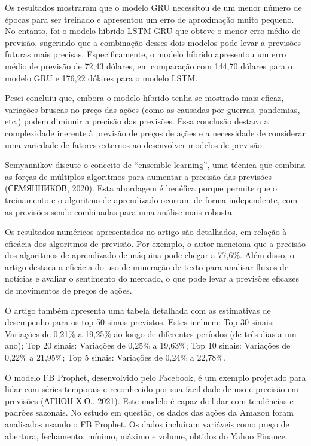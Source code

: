 \documentclass[
]{article}
\begin{document}
Os resultados mostraram que o modelo GRU necessitou de um menor número
de épocas para ser treinado e apresentou um erro de aproximação muito
pequeno. No entanto, foi o modelo híbrido LSTM-GRU que obteve o menor
erro médio de previsão, sugerindo que a combinação desses dois modelos
pode levar a previsões futuras mais precisas. Especificamente, o modelo
híbrido apresentou um erro médio de previsão de 72,43 dólares, em
comparação com 144,70 dólares para o modelo GRU e 176,22 dólares para o
modelo LSTM.

Pesci concluiu que, embora o modelo híbrido tenha se mostrado mais
eficaz, variações bruscas no preço das ações (como as causadas por
guerras, pandemias, etc.) podem diminuir a precisão das previsões. Essa
conclusão destaca a complexidade inerente à previsão de preços de ações
e a necessidade de considerar uma variedade de fatores externos ao
desenvolver modelos de previsão.

Semyannikov discute o conceito de ``ensemble learning'', uma técnica que
combina as forças de múltiplos algoritmos para aumentar a precisão das
previsões (СЕМЯННИКОВ, 2020). Esta abordagem é benéfica porque permite
que o treinamento e o algoritmo de aprendizado ocorram de forma
independente, com as previsões sendo combinadas para uma análise mais
robusta.

Os resultados numéricos apresentados no artigo são detalhados, em
relação à eficácia dos algoritmos de previsão. Por exemplo, o autor
menciona que a precisão dos algoritmos de aprendizado de máquina pode
chegar a 77,6\%. Além disso, o artigo destaca a eficácia do uso de
mineração de texto para analisar fluxos de notícias e avaliar o
sentimento do mercado, o que pode levar a previsões eficazes de
movimentos de preços de ações.

O artigo também apresenta uma tabela detalhada com as estimativas de
desempenho para os top 50 sinais previstos. Estes incluem: Top 30
sinais: Variações de 0,21\% a 19,25\% ao longo de diferentes períodos
(de três dias a um ano); Top 20 sinais: Variações de 0,25\% a 19,63\%;
Top 10 sinais: Variações de 0,22\% a 21,95\%; Top 5 sinais: Variações de
0,24\% a 22,78\%.

O modelo FB Prophet, desenvolvido pelo Facebook, é um exemplo projetado
para lidar com séries temporais e reconhecido por sua facilidade de uso
e precisão em previsões (АГНОН Х.О.. 2021). Este modelo é capaz de lidar
com tendências e padrões sazonais. No estudo em questão, os dados das
ações da Amazon foram analisados usando o FB Prophet. Os dados incluíram
variáveis como preço de abertura, fechamento, mínimo, máximo e volume,
obtidos do Yahoo Finance.
\end{document}
